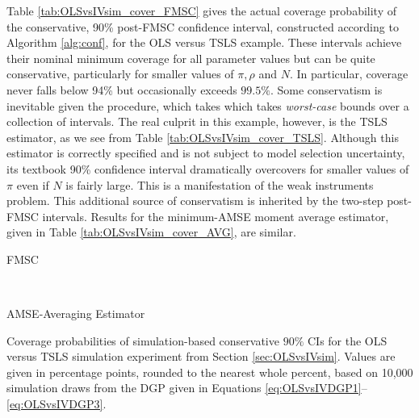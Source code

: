 Table \ref{tab:OLSvsIVsim_cover_FMSC} gives the actual coverage probability of the conservative, 90\% post-FMSC confidence interval, constructed according to Algorithm \ref{alg:conf}, for the OLS versus TSLS example.
These intervals achieve their nominal minimum coverage for all parameter values but can be quite conservative, particularly for smaller values of $\pi, \rho$ and $N$. 
In particular, coverage never falls below 94\% but occasionally exceeds $99.5\%$.
Some conservatism is inevitable given the procedure, which takes which takes \emph{worst-case} bounds over a collection of intervals.
The real culprit in this example, however, is the TSLS estimator, as we see from Table \ref{tab:OLSvsIVsim_cover_TSLS}.
Although this estimator is correctly specified and is not subject to model selection uncertainty, its textbook 90\% confidence interval dramatically overcovers for smaller values of $\pi$ even if $N$ is fairly large.
This is a manifestation of the weak instruments problem.
This additional source of conservatism is inherited by the two-step post-FMSC intervals.
Results for the minimum-AMSE moment average estimator, given in Table \ref{tab:OLSvsIVsim_cover_AVG}, are similar.

\begin{table}[h]
\footnotesize
\centering
	\begin{subtable}{0.48\textwidth}
		\caption{FMSC}
		
		\label{tab:OLSvsIVsim_cover_FMSC}
	\end{subtable}	
	~
	\begin{subtable}{0.48\textwidth}
		\caption{AMSE-Averaging Estimator}
		
		\label{tab:OLSvsIVsim_cover_AVG}
	\end{subtable}
	\caption{Coverage probabilities of simulation-based conservative $90\%$ CIs for the OLS versus TSLS simulation experiment from Section \ref{sec:OLSvsIVsim}. Values are given in percentage points, rounded to the nearest whole percent, based on 10,000 simulation draws from the DGP given in Equations \ref{eq:OLSvsIVDGP1}--\ref{eq:OLSvsIVDGP3}.}
\end{table}

